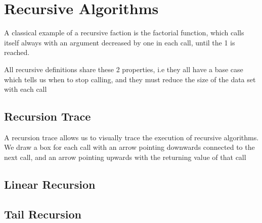 
\section{Recursive Algorithms}



\par{A classical example of a recursive faction is the factorial function, which
calls itself always with an argument decreased by one in each call, until the
 1 is reached.}
\par{All recursive definitions share these 2 properties, i.e they all have a
base case which tells us when to stop calling, and they must reduce the size of
the data set with each call}

\subsection{Recursion Trace}

\par{A recursion trace allows us to visually trace the execution of recursive
algorithms. We draw a box for each call with an arrow pointing downwards
connected to the next call, and an arrow pointing upwards with the returning
value of that call}


\subsection{Linear Recursion}




\subsection{Tail Recursion}

